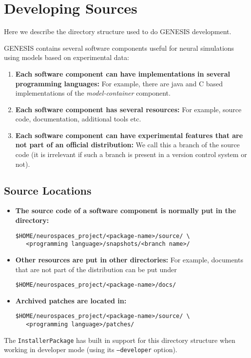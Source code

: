 \documentclass[12pt]{article}
\begin{document}
\section*{Developing Sources}

Here we describe the directory structure used to do GENESIS development.

GENESIS contains several software components useful for neural simulations using models based on experimental data:
\begin{enumerate}
\item {\bf Each software component can have implementations in several programming languages:} For example, there are java and C based implementations of the {\it model-container} component.
\item {\bf Each software component has several resources:} For example, source code, documentation, additional tools etc.
\item {\bf Each software component can have experimental features that are not part of an official distribution:} We call this a branch of the source code (it is irrelevant if such a branch is present in a version control system or not). 
\end{enumerate}

\subsection*{Source Locations}

\begin{itemize}
\item {\bf The source code of a software component is normally put in the directory:}
\begin{verbatim}
$HOME/neurospaces_project/<package-name>/source/ \
   <programming language>/snapshots/<branch name>/
\end{verbatim}

\item {\bf Other resources are put in other directories:} For example, documents that are not part of the distribution can be put under
\begin{verbatim}
$HOME/neurospaces_project/<package-name>/docs/
\end{verbatim}

\item {\bf Archived patches are located in:}
\begin{verbatim}
$HOME/neurospaces_project/<package-name>/source/ \
   <programming language>/patches/ 
\end{verbatim}

\end{itemize}
The {\tt InstallerPackage} has built in support for this directory structure when working in developer mode (using its {\tt --developer} option).
\end{document}
